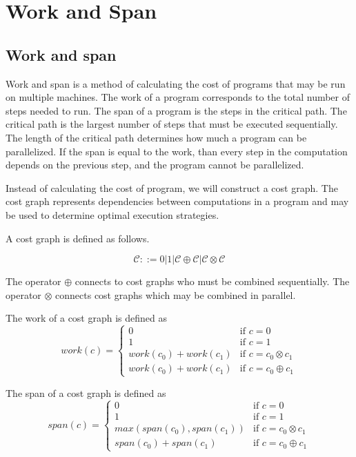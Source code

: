 \chapter{Work and Span}

\section{Work and span}
Work and span is a method of calculating the cost of programs that may be run on multiple machines.
The work of a program corresponds to the total number of steps needed to run.
The span of a program is the steps in the critical path.
The critical path is the largest number of steps that must be executed sequentially.
The length of the critical path determines how much a program can be parallelized.
If the span is equal to the work, than every step in the computation depends on the previous step, and the program cannot be parallelized.

Instead of calculating the cost of program, we will construct a cost graph.
The cost graph represents dependencies between computations in a program and may be used to determine optimal execution strategies.

A cost graph is defined as follows.

\[ \mathcal{C} ::= 0 | 1 | \mathcal{C} \oplus \mathcal{C} | \mathcal{C} \otimes \mathcal{C} \]

The operator $\oplus$ connects to cost graphs who must be combined sequentially.
The operator $\otimes$ connects cost graphs which may be combined in parallel.

The work of a cost graph is defined as 
\begin{equation*}
  work(c) = \begin{cases}
    0 &\text{if } c = 0 \\
    1 &\text{if } c = 1 \\
    work(c_0) + work(c_1) &\text{if } c = c_0 \otimes c_1 \\
    work(c_0) + work(c_1) &\text{if } c = c_0 \oplus c_1
  \end{cases}
\end{equation*}

The span of a cost graph is defined as
\begin{equation*}
  span(c) = \begin{cases}
    0 &\text{if } c = 0 \\
    1 &\text{if } c = 1 \\
    max(span(c_0), span(c_1)) &\text{if } c = c_0 \otimes c_1 \\
    span(c_0) + span(c_1) &\text{if } c = c_0 \oplus c_1
  \end{cases}
\end{equation*}



